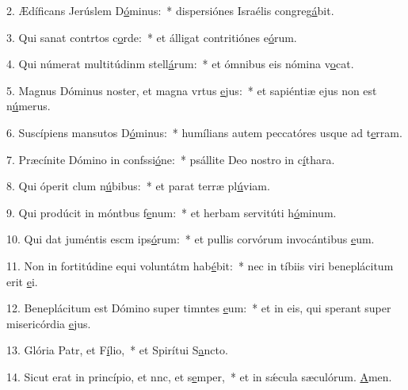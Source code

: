 2. Ædíficans Jerúslem D\uline{ó}minus:~* dispersiónes Israélis congreg\uline{á}bit.\par 
3. Qui sanat contrtos c\uline{o}rde:~* et álligat contritiónes e\uline{ó}rum.\par 
4. Qui númerat multitúdinm stell\uline{á}rum:~* et ómnibus eis nómina v\uline{o}cat.\par 
5. Magnus Dóminus noster, et magna vrtus \uline{e}jus:~* et sapiéntiæ ejus non est n\uline{ú}merus.\par 
6. Suscípiens mansutos D\uline{ó}minus:~* humílians autem peccatóres usque ad t\uline{e}rram.\par 
7. Præcínite Dómino in confssi\uline{ó}ne:~* psállite Deo nostro in c\uline{í}thara.\par 
8. Qui óperit clum n\uline{ú}bibus:~* et parat terræ pl\uline{ú}viam.\par 
9. Qui prodúcit in móntbus f\uline{e}num:~* et herbam servitúti h\uline{ó}minum.\par 
10. Qui dat juméntis escm ips\uline{ó}rum:~* et pullis corvórum invocántibus \uline{e}um.\par 
11. Non in fortitúdine equi voluntátm hab\uline{é}bit:~* nec in tíbiis viri beneplácitum erit \uline{e}i.\par 
12. Beneplácitum est Dómino super timntes \uline{e}um:~* et in eis, qui sperant super misericórdia \uline{e}jus.\par 
13. Glória Patr, et F\uline{í}lio,~* et Spirítui S\uline{a}ncto.\par 
14. Sicut erat in princípio, et nnc, et s\uline{e}mper,~* et in sǽcula sæculórum. \uline{A}men.\par 
